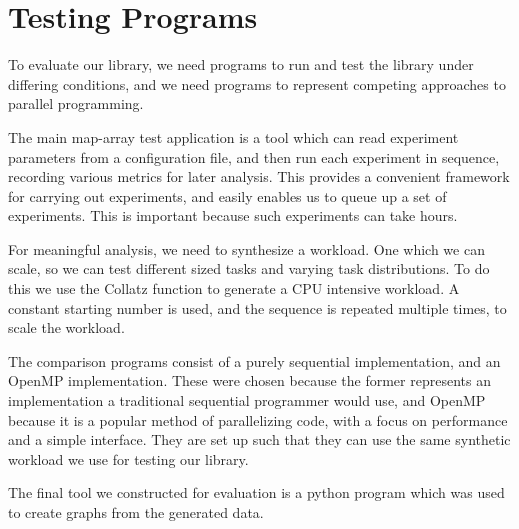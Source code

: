 \section{Testing Programs}

To evaluate our library, we need programs to run and test the library under differing conditions, and we need programs to represent competing approaches to parallel programming. 

The main map-array test application is a tool which can read experiment parameters from a configuration file, and then run each experiment in sequence, recording various metrics for later analysis. This provides a convenient framework for carrying out experiments, and easily enables us to queue up a set of experiments. This is important because such experiments can take hours.

For meaningful analysis, we need to synthesize a workload. One which we can scale, so we can test different sized tasks and varying task distributions. To do this we use the Collatz function to generate a CPU intensive workload. A constant starting number is used, and the sequence is repeated multiple times, to scale the workload.

The comparison programs consist of a purely sequential implementation, and an OpenMP implementation. These were chosen because the former represents an implementation a traditional sequential programmer would use, and OpenMP because it is a popular method of parallelizing code, with a focus on performance and a simple interface. They are set up such that they can use the same synthetic workload we use for testing our library.

The final tool we constructed for evaluation is a python program which was used to create graphs from the generated data.